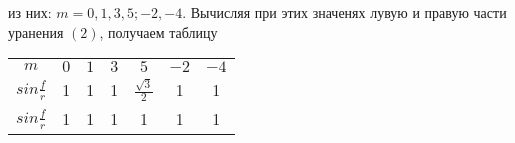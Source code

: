 \documentclass[12pt]{article}
\begin{document}
\begin{multicols}{2}
из них: \(m=0, 1, 3, 5; -2, -4\). Вычисляя при этих значенях лувую и правую части уранения $(2)$, получаем таблицу 
\begin{tabular}{|c|c|c|c|c|c|c|} %
\hline
$m$ & $0$ & $1$ & $3$ & $5$ & $-2$ & $-4$ \\
$sin$$\frac{f}{r}$
&1 &1 &1 & $\frac{\sqrt{3}}{2}$ &1 &1  \\
\(sin\frac{f}{r}\) & 1& 1& 1& 1& 1& 1 \\
\hline
\end{tabular}
\end{multicols}
\end{document}
